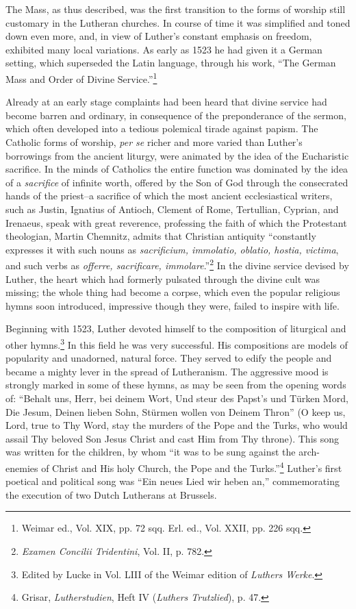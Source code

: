 The Mass, as thus described, was the first transition to the forms
of worship still customary in the Lutheran churches. In course of
time it was simplified and toned down even more, and, in view of
Luther’s constant emphasis on freedom, exhibited many local variations.
As early as 1523 he had given it a German setting, which superseded
the Latin language, through his work, “The German Mass and
Order of Divine Service.”\footnote{Weimar ed., Vol. XIX, pp. 72 sqq. Erl. ed., Vol. XXII, pp. 226 sqq.}

Already at an early stage complaints had been heard that divine
service had become barren and ordinary, in consequence of the preponderance
of the sermon, which often developed into a tedious
polemical tirade against papism. The Catholic forms of worship,
\textit{per se} richer and more varied than Luther’s borrowings from the
ancient liturgy, were animated by the idea of the Eucharistic sacrifice.
In the minds of Catholics the entire function was dominated
by the idea of a \textit{sacrifice} of infinite worth, offered by the Son of
God through the consecrated hands of the priest--a sacrifice of
which the most ancient ecclesiastical writers, such as Justin, Ignatius
of Antioch, Clement of Rome, Tertullian, Cyprian, and Irenaeus,
speak with great reverence, professing the faith of which the Protestant
theologian, Martin Chemnitz, admits that Christian antiquity
“constantly expresses it with such nouns as \textit{sacrificium, immolatio,
oblatio, hostia, victima}, and such verbs as \textit{offerre, sacrificare, immolare}.”\footnote
{\textit{Examen Concilii Tridentini}, Vol. II, p. 782.}
In the divine service devised by Luther, the heart which
had formerly pulsated through the divine cult was missing; the
whole thing had become a corpse, which even the popular religious
hymns soon introduced, impressive though they were, failed to inspire
with life.

Beginning with 1523, Luther devoted himself to the composition
of liturgical and other hymns.\footnote
{Edited by Lucke in Vol. LIII of the Weimar edition of \textit{Luthers Werke}.}
In this field he was very successful.
His compositions are models of popularity and unadorned, natural
force. They served to edify the people and became a mighty lever
in the spread of Lutheranism. The aggressive mood is strongly
marked in some of these hymns, as may be seen from the opening
words of: “Behalt uns, Herr, bei deinem Wort, Und steur des Papst’s
und Türken Mord, Die Jesum, Deinen lieben Sohn, Stürmen wollen
von Deinem Thron” (O keep us, Lord, true to Thy Word, stay the
murders of the Pope and the Turks, who would assail Thy beloved
Son Jesus Christ and cast Him from Thy throne). This song was
written for the children, by whom “it was to be sung against the
arch-enemies of Christ and His holy Church, the Pope and the
Turks.”\footnote
{Grisar, \textit{Lutherstudien}, Heft IV (\textit{Luthers Trutzlied}), p. 47.}
Luther’s first poetical and political song was “Ein neues
Lied wir heben an,” commemorating the execution of two Dutch
Lutherans at Brussels.

